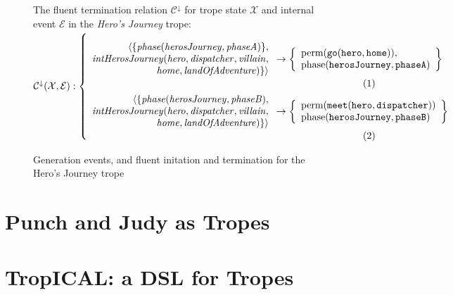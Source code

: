 \begin{figure*}[!t]
The fluent termination relation $\mathcal{C^{\downarrow}}$ for trope state $\mathcal{X}$ and internal event $\mathcal{E}$ in the \emph{Hero's Journey} trope:\\
$\mathcal{C^{\downarrow} (X, E)}:\left\{\mbox{%
\begin{minipage}[c]{0.85\textwidth}
\begin{align}
\begin{array}{r}
                                 \langle \{\mathit{phase(herosJourney, phaseA)}\},\\
  \mathit{intHerosJourney(hero, dispatcher, villain},\\ \mathit{home, landOfAdventure)}\} \rangle
  \end{array}
&\rightarrow \left\{
\begin{array}{l}\text{perm}(\mathtt{go(hero, home)}),\\
\text{phase}(\mathtt{herosJourney, phaseA})
\end{array}
\right\}\label{eq:crt}\\
\begin{array}{r}
                                 \langle\{\mathit{phase(herosJourney, phaseB)},\\
  \mathit{intHerosJourney(hero, dispatcher, villain},\\ \mathit{home, landOfAdventure)}\} \rangle
  \end{array}
&\rightarrow \left\{
\begin{array}{l}
\text{perm}(\mathtt{meet(hero, dispatcher)})\\
\text{phase}(\mathtt{herosJourney, phaseB})
\end{array}
\right\}\label{eq:crst}
\end{align}
\end{minipage}
}\right.$
\caption{Generation events, and fluent initation and termination for the Hero's Journey trope}
\label{fig:gen}
\label{fig:init}
\label{fig:term}
\end{figure*}%

\section{Punch and Judy as Tropes}

\section{TropICAL: a DSL for Tropes} %
\label{sec:tropical}

